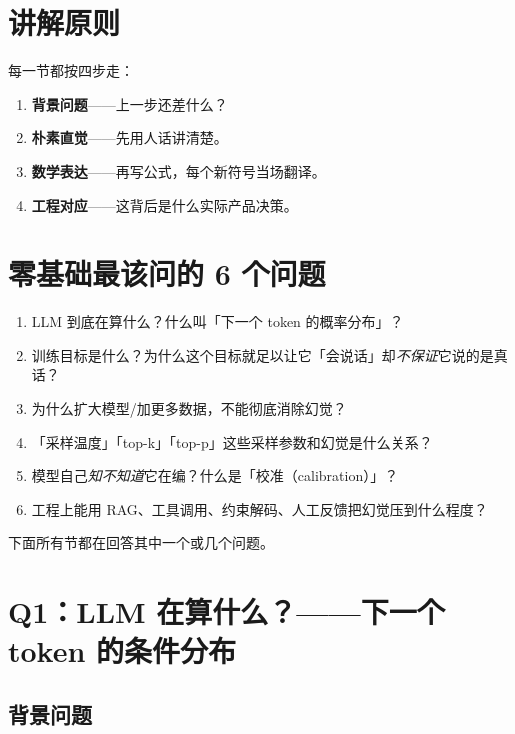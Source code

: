 \documentclass[11pt,a4paper]{ctexart}
\begin{document}
\section{讲解原则}

每一节都按四步走：
\begin{enumerate}[label=\textbf{\arabic*.}]
  \item \textbf{背景问题}——上一步还差什么？
  \item \textbf{朴素直觉}——先用人话讲清楚。
  \item \textbf{数学表达}——再写公式，每个新符号当场翻译。
  \item \textbf{工程对应}——这背后是什么实际产品决策。
\end{enumerate}

\section{零基础最该问的 6 个问题}

\begin{enumerate}[label=\textbf{Q\arabic*.}]
  \item LLM 到底在算什么？什么叫「下一个 token 的概率分布」？
  \item 训练目标是什么？为什么这个目标就足以让它「会说话」却\emph{不保证}它说的是真话？
  \item 为什么扩大模型/加更多数据，不能彻底消除幻觉？
  \item 「采样温度」「top-k」「top-p」这些采样参数和幻觉是什么关系？
  \item 模型自己\emph{知不知道}它在编？什么是「校准（calibration）」？
  \item 工程上能用 RAG、工具调用、约束解码、人工反馈把幻觉压到什么程度？
\end{enumerate}

下面所有节都在回答其中一个或几个问题。

\section{Q1：LLM 在算什么？——下一个 token 的条件分布}

\subsection{背景问题}
\end{document}
